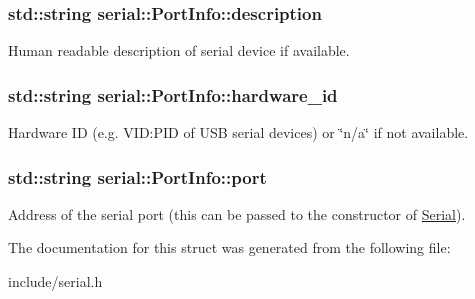 \subsubsection[{\texorpdfstring{description}{description}}]{\setlength{\rightskip}{0pt plus 5cm}std\+::string serial\+::\+Port\+Info\+::description}\hypertarget{structserial_1_1_port_info_a2ba37dd33d47b554aef5c15c1fe8b872}{}\label{structserial_1_1_port_info_a2ba37dd33d47b554aef5c15c1fe8b872}
Human readable description of serial device if available. 
\subsubsection[{\texorpdfstring{hardware\+\_\+id}{hardware_id}}]{\setlength{\rightskip}{0pt plus 5cm}std\+::string serial\+::\+Port\+Info\+::hardware\+\_\+id}\hypertarget{structserial_1_1_port_info_a7d55368e1a4e6ccc9da6f4d339524837}{}\label{structserial_1_1_port_info_a7d55368e1a4e6ccc9da6f4d339524837}
Hardware ID (e.\+g. V\+ID\+:P\+ID of U\+SB serial devices) or \char`\"{}n/a\char`\"{} if not available. 
\subsubsection[{\texorpdfstring{port}{port}}]{\setlength{\rightskip}{0pt plus 5cm}std\+::string serial\+::\+Port\+Info\+::port}\hypertarget{structserial_1_1_port_info_a5d4242cdd6c0d01260e24964af4c23d2}{}\label{structserial_1_1_port_info_a5d4242cdd6c0d01260e24964af4c23d2}
Address of the serial port (this can be passed to the constructor of \hyperlink{classserial_1_1_serial}{Serial}). 

The documentation for this struct was generated from the following file\+:\begin{DoxyCompactItemize}
\item 
include/serial.\+h\end{DoxyCompactItemize}
